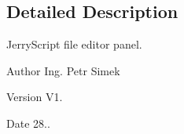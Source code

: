 \subsection{Detailed Description}
Jerry\+Script file editor panel. 

\begin{DoxyAuthor}{Author}
Ing. Petr Simek 
\end{DoxyAuthor}
\begin{DoxyVersion}{Version}
V1. 
\end{DoxyVersion}
\begin{DoxyDate}{Date}
28.. 
\end{DoxyDate}
